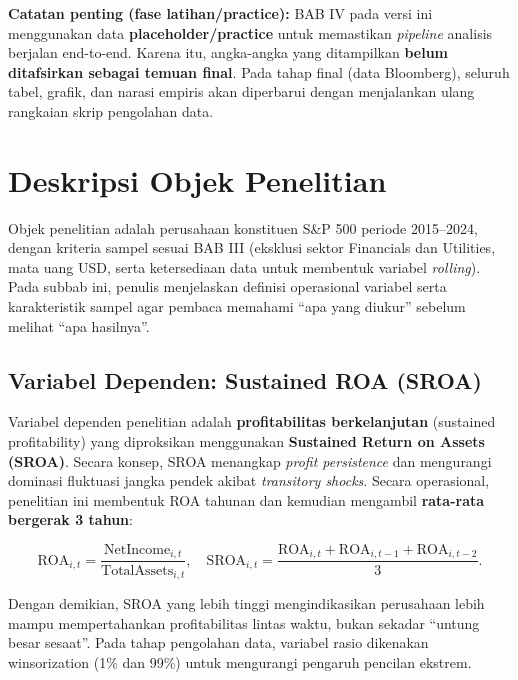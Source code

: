\documentclass[12pt,a4paper]{report}
\begin{document}
\textbf{Catatan penting (fase latihan/practice):} BAB IV pada versi ini
menggunakan data \textbf{placeholder/practice} untuk memastikan
\emph{pipeline} analisis berjalan end-to-end. Karena itu, angka-angka
yang ditampilkan \textbf{belum ditafsirkan sebagai temuan final}. Pada
tahap final (data Bloomberg), seluruh tabel, grafik, dan narasi empiris
akan diperbarui dengan menjalankan ulang rangkaian skrip pengolahan
data.

\hypertarget{deskripsi-objek-penelitian}{%
\section{Deskripsi Objek Penelitian}\label{deskripsi-objek-penelitian}}

Objek penelitian adalah perusahaan konstituen S\&P 500 periode
2015--2024, dengan kriteria sampel sesuai BAB III (eksklusi sektor
Financials dan Utilities, mata uang USD, serta ketersediaan data untuk
membentuk variabel \emph{rolling}). Pada subbab ini, penulis menjelaskan
definisi operasional variabel serta karakteristik sampel agar pembaca
memahami ``apa yang diukur'' sebelum melihat ``apa hasilnya''.

\hypertarget{variabel-dependen-sustained-roa-sroa}{%
\subsection{Variabel Dependen: Sustained ROA
(SROA)}\label{variabel-dependen-sustained-roa-sroa}}

Variabel dependen penelitian adalah \textbf{profitabilitas
berkelanjutan} (sustained profitability) yang diproksikan menggunakan
\textbf{Sustained Return on Assets (SROA)}. Secara konsep, SROA
menangkap \emph{profit persistence} dan mengurangi dominasi fluktuasi
jangka pendek akibat \emph{transitory shocks}. Secara operasional,
penelitian ini membentuk ROA tahunan dan kemudian mengambil
\textbf{rata-rata bergerak 3 tahun}:

\[
\mathrm{ROA}_{i,t} = \frac{\mathrm{NetIncome}_{i,t}}{\mathrm{TotalAssets}_{i,t}},\quad
\mathrm{SROA}_{i,t} = \frac{\mathrm{ROA}_{i,t}+\mathrm{ROA}_{i,t-1}+\mathrm{ROA}_{i,t-2}}{3}.
\]

Dengan demikian, SROA yang lebih tinggi mengindikasikan perusahaan lebih
mampu mempertahankan profitabilitas lintas waktu, bukan sekadar ``untung
besar sesaat''. Pada tahap pengolahan data, variabel rasio dikenakan
winsorization (1\% dan 99\%) untuk mengurangi pengaruh pencilan ekstrem.
\end{document}
